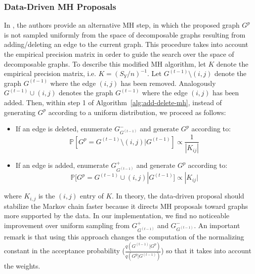 \subsubsection{Data-Driven MH Proposals}
In \textcite{donnet2012empirical}, the authors provide an alternative MH step, in which the proposed graph $G^p$ is not sampled uniformly from the space of decomposable graphs resulting from adding/deleting an edge to the current graph. This procedure takes into account the empirical precision matrix in order to guide the search over the space of decomposable graphs. To describe this modified MH algorithm, let $K$ denote the empirical precision matrix, i.e. $K = (S_Y/n)^{-1}$. Let $G^{(t-1)}\setminus (i,j)$ denote the graph $G^{(t-1)}$ where the edge $(i,j)$ has been removed. Analogously $G^{(t-1)}\cup (i,j)$ denotes the graph $G^{(t-1)}$ where the edge $(i,j)$ has been added. Then, within step 1 of Algorithm~\ref{alg:add-delete-mh}, instead of generating $G^p$ according to a uniform distribution, we proceed as follows:
\begin{itemize}
    \item If an edge is deleted, enumerate $G^{-}_{G^{(t-1)}}$ and generate $G^p$ according to: \begin{equation*}
        \mathbb{P}[G^p =  G^{(t-1)}\setminus(i,j)|G^{(t-1)}] \propto \frac{1}{|K_{ij}|}
    \end{equation*}
    \item If an edge is added, enumerate $G^{+}_{G^{(t-1)}}$ and generate $G^p$ according to:
    \begin{equation*}
                \mathbb{P}[G^p =  G^{(t-1)}\cup(i,j)|G^{(t-1)}] \propto |K_{ij}|
    \end{equation*}
\end{itemize}
where $K_{i,j}$ is the $(i,j)$ entry of $K$. In theory, the data-driven proposal should stabilize the Markov chain faster because it directs MH proposals toward graphs more supported by the data. In our implementation, we find no noticeable improvement over uniform sampling from $G_{G^{(t-1)}}^{+}$ and $G_{G^{(t-1)}}^{-}$.
An important remark is that using this approach changes the computation of the normalizing constant in the acceptance probability ($\frac{q(G^{(t-1)}|G^p)}{q(G^p|G^{(t-1)})}$) so that it takes into account the weights. 

